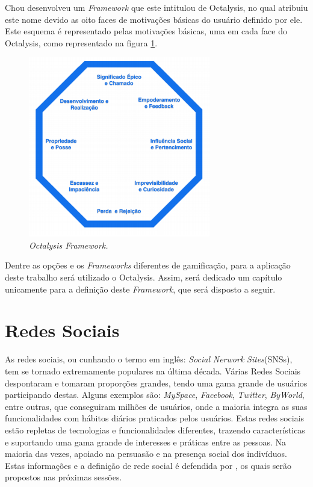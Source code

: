 Chou desenvolveu um \textit{Framework} que este intitulou de Octalysis, no qual atribuiu
este nome devido as oito faces de motivações básicas do usuário definido por ele.
Este esquema é representado pelas motivações básicas, uma em cada face do Octalysis,
como representado na figura \ref{fig:octalysisex}.

\begin{figure}[h]
    \centering
    \includegraphics[width=300px, scale=1]{figuras/octalysisex}
    \caption{\textit{Octalysis Framework.}}
    \label{fig:octalysisex}
\end{figure}

Dentre as opções e os \textit{Frameworks} diferentes de gamificação, para a aplicação
deste trabalho será utilizado o Octalysis. Assim, será dedicado um capítulo
unicamente para a definição deste \textit{Framework}, que será disposto a seguir.



\section{Redes Sociais}
\label{sec:redessociais}
As redes sociais, ou cunhando o termo em inglês: \textit{Social} \textit{Nerwork} \textit{Sites}(SNSs),
tem se tornado extremamente populares na última década. 
Várias
Redes Sociais despontaram e tomaram proporções grandes, tendo uma gama grande
de usuários participando destas. Alguns exemplos são: \textit{MySpace}, \textit{Facebook}, \textit{Twitter},
\textit{ByWorld}, entre outras, que conseguiram milhões de usuários, onde a maioria integra
as suas funcionalidades com hábitos diários praticados pelos usuários.
Estas redes sociais estão repletas de tecnologias e funcionalidades diferentes,
trazendo características e suportando uma gama grande de interesses e práticas
entre as pessoas. Na maioria das vezes, apoiado na persuasão e na presença social
dos indivíduos. Estas informações e a definição de rede social é defendida por
\cite{socialnetworkdefinition}, os quais serão propostos nas próximas sessões.
